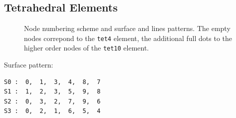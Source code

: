 \newpage
\subsection{Tetrahedral Elements}

\begin{figure}[h!]
\begin{center}
\caption{Node numbering scheme and surface and lines patterns. The empty nodes correpond to the \texttt{tet4} element, the additional full dots to the higher order nodes of the \texttt{tet10} element.}
\label{fig:conventions:tet}
\end{center}
\end{figure}

Surface pattern:
\begin{verbatim}
S0 :  0,  1,  3,  4,  8,  7
S1 :  1,  2,  3,  5,  9,  8
S2 :  0,  3,  2,  7,  9,  6
S3 :  0,  2,  1,  6,  5,  4
\end{verbatim}

